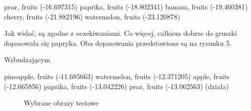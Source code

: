 \documentclass[a4paper,12pt,leqno]{article}
\begin{document}
pear, fruits (-16.697315)
paprika, fruits (-18.802341)
banana, fruits (-19.460381)
cherry, fruits (-21.882196)
watermelon, fruits (-23.120878)

Jak widać, są zgodne z oczekiwaniami. Co więcej, całkiem dobrze do gruszki dopasowała się papryka. Oba dopasowania przedstawione są na rysunku 5.


Wzbudzającym 

pineapple, fruits (-11.685663)
watermelon, fruits (-12.371205)
apple, fruits (-12.665856)
paprika, fruits (-13.042226)
pear, fruits (-13.062563) (działa)




\begin{figure}\centering
{}
\caption{Wybrane obrazy testowe}
\end{figure}
\end{document}
